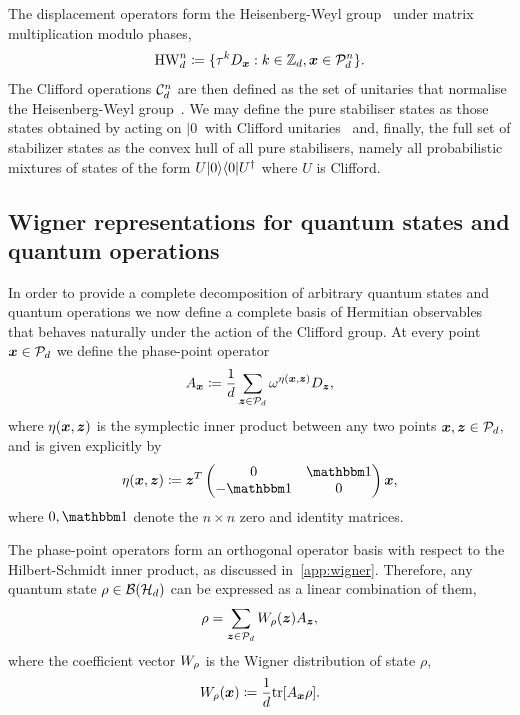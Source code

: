 \documentclass[pra,
aps,
twocolumn,
superscriptaddress,
groupedaddress,
nofootinbib,
reprint
]{revtex4-1}
\begin{document}
The displacement operators form the Heisenberg-Weyl group~\cite{Folland_1989, Bengtsson_2006} under matrix multiplication modulo phases,
\begin{equation}\label{eq:gp}
    {\rm{HW}}_d^n \coloneqq \{ \tau^k D_{\bmx}: k \in \mathbb{Z}_d, \bmx \in \cal{P}_d^n\}.
\end{equation}
The Clifford operations $ \cal{C}_d^n $ are then defined as the set of unitaries that normalise the Heisenberg-Weyl group~\cite{Appleby_2005}. We may define the pure stabiliser states as those states obtained by acting on $|0\>$ with Clifford unitaries~\cite{cit:gross3} and, finally, the full set of stabilizer states as the convex hull of all pure stabilisers, namely all probabilistic mixtures of states of the form $U|0\>\<0|U^\dagger$ where $U$ is Clifford. 

\subsection{Wigner representations for quantum states and quantum operations}\label{sec:wigner}

In order to provide a complete decomposition of arbitrary quantum states and quantum operations we now define a complete basis of Hermitian observables that behaves naturally under the action of the Clifford group. At every point $\x \in \P_d$ we define the phase-point operator
\begin{equation}\label{eq:ax}
	A_{\bmx} \coloneqq \frac{1}{d} \sum_{\bmz \in \cal{P}_d} \omega^{\eta(\bmx, \bmz)} D_{\bmz}, 
\end{equation}
where $\eta(\bmx, \bmz)$ is the symplectic inner product between any two points $\x,\z \in \P_d$, and is given explicitly by
\begin{equation}
	\eta(\bmx, \bmz) \coloneqq \bmz^T \begin{pmatrix}
		0  & \id \\ %
		-\id & 0 \\ %
	\end{pmatrix} \bmx,
\end{equation}
where $0, \id$ denote the $n\times n$ zero and identity matrices.

The phase-point operators form an orthogonal operator basis with respect to the Hilbert-Schmidt inner product, as discussed in~\cref{app:wigner}.
Therefore, any quantum state $\rho \in \cal{B}(\cal{H}_d)$ can be expressed as a linear combination of them,
\begin{equation}
    \rho = \sum_{\bmz \in \cal{P}_d} \W[\bmz]{\rho} A_{\bmz},
\end{equation}
where the coefficient vector $\W{\rho}$ is the Wigner distribution of state $\rho$,
\begin{equation}\label{eq:wstate}
    \W[\bmx]{\rho} \coloneqq \frac{1}{d}\tr[A_{\bmx} \rho].
\end{equation}
\end{document}
